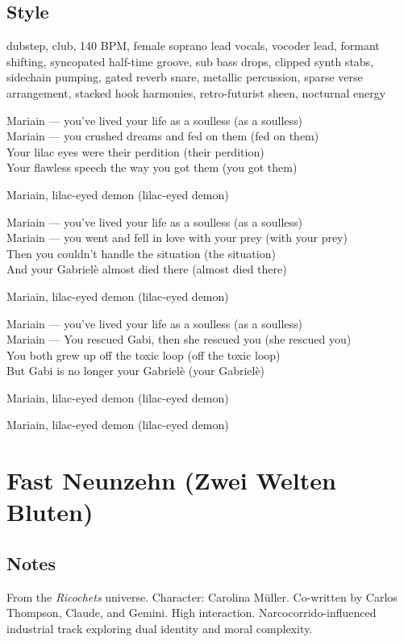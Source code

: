 \subsection{Style}
dubstep, club, 140 BPM, female soprano lead vocals, vocoder lead, formant shifting, syncopated half-time groove, sub bass drops, clipped synth stabs, sidechain pumping, gated reverb snare, metallic percussion, sparse verse arrangement, stacked hook harmonies, retro-futurist sheen, nocturnal energy

\begin{lyrics}

Mariain — you've lived your life as a soulless (as a soulless)\\
Mariain — you crushed dreams and fed on them (fed on them)\\
Your lilac eyes were their perdition (their perdition)\\
Your flawless speech the way you got them (you got them) 

Mariain, lilac-eyed demon (lilac-eyed demon) 

Mariain — you've lived your life as a soulless (as a soulless)\\ 
Mariain — you went and fell in love with your prey (with your prey)\\
Then you couldn't handle the situation (the situation)\\
And your Gabrielè almost died there (almost died there)

Mariain, lilac-eyed demon (lilac-eyed demon) 

Mariain — you've lived your life as a soulless (as a soulless)\\
Mariain — You rescued Gabi, then she rescued you (she rescued you)\\
You both grew up off the toxic loop (off the toxic loop)\\
But Gabi is no longer your Gabrielè (your Gabrielè)

Mariain, lilac-eyed demon (lilac-eyed demon) 

Mariain, lilac-eyed demon (lilac-eyed demon) 

\end{lyrics}

\section{Fast Neunzehn (Zwei Welten Bluten)}

\subsection{Notes}
From the \emph{Ricochets} universe.
Character: Carolina Müller.
Co-written by Carlos Thompson, Claude, and Gemini. High interaction.
Narcocorrido-influenced industrial track exploring dual identity and moral complexity.

